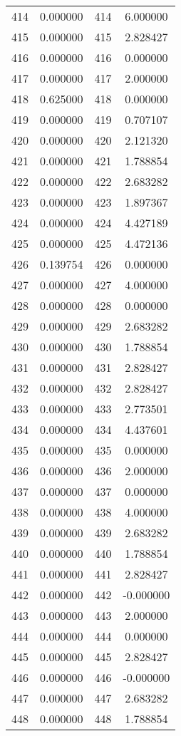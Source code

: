 \documentclass[12pt]{article}
\begin{document}
\begin{longtable}{@{}cccc@{}}
414 & 0.000000 & 414 & 6.000000 \\
415 & 0.000000 & 415 & 2.828427 \\
416 & 0.000000 & 416 & 0.000000 \\
417 & 0.000000 & 417 & 2.000000 \\
418 & 0.625000 & 418 & 0.000000 \\
419 & 0.000000 & 419 & 0.707107 \\
420 & 0.000000 & 420 & 2.121320 \\
421 & 0.000000 & 421 & 1.788854 \\
422 & 0.000000 & 422 & 2.683282 \\
423 & 0.000000 & 423 & 1.897367 \\
424 & 0.000000 & 424 & 4.427189 \\
425 & 0.000000 & 425 & 4.472136 \\
426 & 0.139754 & 426 & 0.000000 \\
427 & 0.000000 & 427 & 4.000000 \\
428 & 0.000000 & 428 & 0.000000 \\
429 & 0.000000 & 429 & 2.683282 \\
430 & 0.000000 & 430 & 1.788854 \\
431 & 0.000000 & 431 & 2.828427 \\
432 & 0.000000 & 432 & 2.828427 \\
433 & 0.000000 & 433 & 2.773501 \\
434 & 0.000000 & 434 & 4.437601 \\
435 & 0.000000 & 435 & 0.000000 \\
436 & 0.000000 & 436 & 2.000000 \\
437 & 0.000000 & 437 & 0.000000 \\
438 & 0.000000 & 438 & 4.000000 \\
439 & 0.000000 & 439 & 2.683282 \\
440 & 0.000000 & 440 & 1.788854 \\
441 & 0.000000 & 441 & 2.828427 \\
442 & 0.000000 & 442 & -0.000000 \\
443 & 0.000000 & 443 & 2.000000 \\
444 & 0.000000 & 444 & 0.000000 \\
445 & 0.000000 & 445 & 2.828427 \\
446 & 0.000000 & 446 & -0.000000 \\
447 & 0.000000 & 447 & 2.683282 \\
448 & 0.000000 & 448 & 1.788854 \\

\end{longtable}
\end{document}
